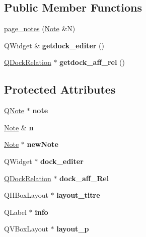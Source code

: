 \subsection*{Public Member Functions}
\begin{DoxyCompactItemize}
\item 
\hyperlink{classpage__notes_ad9a1b3dbe6c7901ed37a5784b1094fa6}{page\+\_\+notes} (\hyperlink{class_note}{Note} \&N)
\item 
\mbox{\label{classpage__notes_ab2beff1e0ece138a3a7e1419bfa8fbde}} 
Q\+Widget \& {\bfseries getdock\+\_\+editer} ()
\item 
\mbox{\label{classpage__notes_a6516f7d84e5a7f9cb06d733aa4a02697}} 
\hyperlink{class_q_dock_relation}{Q\+Dock\+Relation} $\ast$ {\bfseries getdock\+\_\+aff\+\_\+rel} ()
\end{DoxyCompactItemize}
\subsection*{Protected Attributes}
\begin{DoxyCompactItemize}
\item 
\mbox{\label{classpage__notes_af15159fd1cf5f4ecd8f0f3a0b5ccf6fd}} 
\hyperlink{class_q_note}{Q\+Note} $\ast$ {\bfseries note}
\item 
\mbox{\label{classpage__notes_aa489945106b1906c38225f917ef1ff8a}} 
\hyperlink{class_note}{Note} \& {\bfseries n}
\item 
\mbox{\label{classpage__notes_a57cc956b9cf511e9c2ad7e78820743f5}} 
\hyperlink{class_note}{Note} $\ast$ {\bfseries new\+Note}
\item 
\mbox{\label{classpage__notes_a2445133fcbfcdef639f5cc8817a7ca65}} 
Q\+Widget $\ast$ {\bfseries dock\+\_\+editer}
\item 
\mbox{\label{classpage__notes_a3c98fc011e1d4f6a75d13adc37d87508}} 
\hyperlink{class_q_dock_relation}{Q\+Dock\+Relation} $\ast$ {\bfseries dock\+\_\+aff\+\_\+\+Rel}
\item 
\mbox{\label{classpage__notes_a8fa8988ebd8d9f9eab736f2ddc0d39c4}} 
Q\+H\+Box\+Layout $\ast$ {\bfseries layout\+\_\+titre}
\item 
\mbox{\label{classpage__notes_abf1c0fe35738e7d46f4d9b84a23e8c4c}} 
Q\+Label $\ast$ {\bfseries info}
\item 
\mbox{\label{classpage__notes_a8276d35406affafde4a3305737c29f37}} 
Q\+V\+Box\+Layout $\ast$ {\bfseries layout\+\_\+p}
\end{DoxyCompactItemize}


